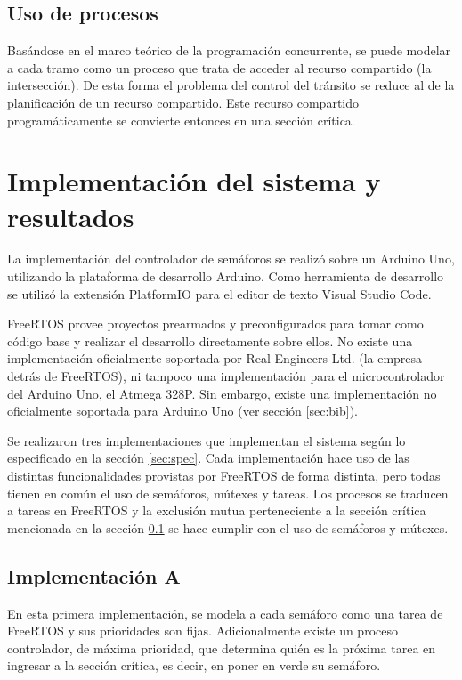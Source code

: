 	\subsection{Uso de procesos}\label{sec:proc}

		Basándose en el marco teórico de la programación concurrente, se puede modelar a cada tramo como un proceso que trata de acceder al recurso compartido (la intersección).
		De esta forma el problema del control del tránsito se reduce al de la planificación de un recurso compartido.
		Este recurso compartido programáticamente se convierte entonces en una sección crítica.



\section{Implementación del sistema y resultados}

	La implementación del controlador de semáforos se realizó sobre un Arduino Uno, utilizando la plataforma de desarrollo Arduino.
	Como herramienta de desarrollo se utilizó la extensión PlatformIO para el editor de texto Visual Studio Code.

	FreeRTOS provee proyectos prearmados y preconfigurados para tomar como código base y realizar el desarrollo directamente sobre ellos.
	No existe una implementación oficialmente soportada por Real Engineers Ltd. (la empresa detrás de FreeRTOS), ni tampoco una implementación para el microcontrolador del Arduino Uno, el Atmega 328P.
	Sin embargo, existe una implementación no oficialmente soportada para Arduino Uno (ver sección \ref{sec:bib}).
	

	Se realizaron tres implementaciones que implementan el sistema según lo especificado en la sección \ref{sec:spec}.
	Cada implementación hace uso de las distintas funcionalidades provistas por FreeRTOS de forma distinta, pero todas tienen en común el uso de semáforos, mútexes y tareas.
	Los procesos se traducen a tareas en FreeRTOS y la exclusión mutua perteneciente a la sección crítica mencionada en la sección \ref{sec:proc} se hace cumplir con el uso de semáforos y mútexes.



	\subsection{Implementación A}

	En esta primera implementación, se modela a cada semáforo como una tarea de FreeRTOS y sus prioridades son fijas.
	Adicionalmente existe un proceso controlador, de máxima prioridad, que determina quién es la próxima tarea en ingresar a la sección crítica, es decir, en poner en verde su semáforo.

